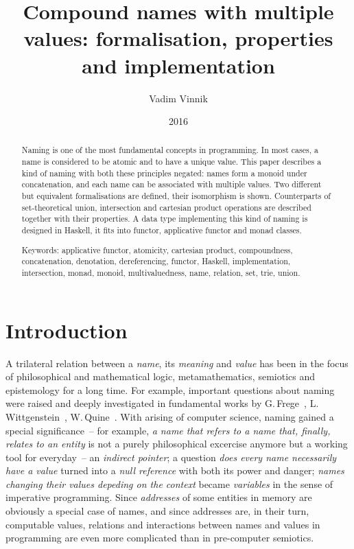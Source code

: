 \documentclass{article}
\title{Compound names with multiple values: formalisation, properties and implementation}
\author{Vadim Vinnik}
\date{2016}
\theoremstyle{definition}
\begin{document}
\maketitle

\begin{abstract}
Naming is one of the most fundamental concepts in programming.  In most
cases, a name is considered to be atomic and to have a unique value.  This
paper describes a kind of naming with both these principles negated: names form
a monoid under concatenation, and each name can be associated with multiple
values.  Two different but equivalent formalisations are defined, their
isomorphism is shown.  Counterparts of set-theoretical union, intersection and
cartesian product operations are described together with their properties.  A
data type implementing this kind of naming is designed in Haskell, it fits into
functor, applicative functor and monad classes.

Keywords:
applicative functor,
atomicity,
cartesian product,
compoundness,
concatenation,
denotation,
dereferencing,
functor,
Haskell,
implementation,
intersection,
monad,
monoid,
multivaluedness,
name,
relation,
set,
trie,
union.
\end{abstract}



\tableofcontents



\section{Introduction}

A trilateral relation between a \emph{name}, its \emph{meaning} and \emph{value}
has been in the focus of philosophical and mathematical logic, metamathematics,
semiotics and epistemology for a long time.  For example, important questions
about naming were raised and deeply investigated in fundamental works by
G.\,Frege~\cite{bib:frege},
L.\,Wittgenstein~\cite{bib:wittgenstein},
W.\,Quine~\cite{bib:quine}.
With arising of computer science, naming gained a special significance~-- for
example, \emph{a name that refers to a name that, finally, relates to an
entity} is not a purely philosophical excercise anymore but a working tool for
everyday~-- an \emph{indirect pointer}; a question \emph{does every name
necessarily have a value} turned into a \emph{null reference} with both its
power and danger; \emph{names changing their values depeding on the context}
became \emph{variables} in the sense of imperative programming. Since
\emph{addresses} of some entities in memory are obviously a special case of
names, and since addresses are, in their turn, computable values,
relations and interactions between names and values in programming are even
more complicated than in pre-computer semiotics.
\end{document}
